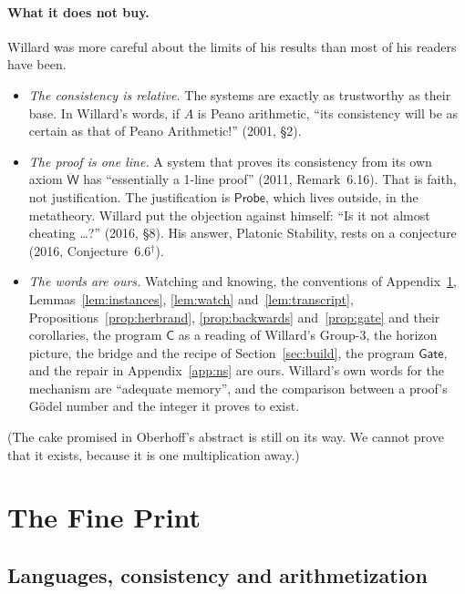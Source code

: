 \documentclass[11pt]{article}
\newcommand{\W}{\ddot{\mathsf{W}}}          %
\newcommand{\Prog}[1]{\mathsf{#1}}
\newcommand{\sk}{\ensuremath{^\dagger}}    %
\theoremstyle{plain}
\theoremstyle{definition}
\begin{document}
\paragraph{What it does not buy.} Willard was more careful about the limits
of his results than most of his readers have been.
\begin{itemize}[leftmargin=1.5em]
\item \emph{The consistency is relative.} The systems are exactly as
  trustworthy as their base. In Willard's words, if $A$ is Peano arithmetic,
  ``its consistency will be as certain as that of Peano Arithmetic!''
  (2001, \S2).
\item \emph{The proof is one line.} A system that proves its consistency from
  its own axiom $\W$ has ``essentially a 1-line proof'' (2011, Remark~6.16).
  That is faith, not justification. The justification is $\Prog{Probe}$,
  which lives outside, in the metatheory. Willard put the objection against
  himself: ``Is it not almost cheating \ldots?'' (2016, \S8). His answer,
  Platonic Stability, rests on a conjecture (2016, Conjecture~6.6\sk).
\item \emph{The words are ours.} Watching and knowing, the conventions of
  Appendix~\ref{app:fine}, Lemmas~\ref{lem:instances}, \ref{lem:watch}
  and~\ref{lem:transcript}, Propositions~\ref{prop:herbrand},
  \ref{prop:backwards} and~\ref{prop:gate} and their corollaries, the
  program $\Prog{C}$ as a reading of Willard's Group-3, the horizon picture,
  the bridge and the recipe of Section~\ref{sec:build}, the program
  $\Prog{Gate}$, and the repair in Appendix~\ref{app:ns} are ours. Willard's
  own words for the mechanism are ``adequate memory'', and the comparison
  between a proof's Gödel number and the integer it proves to exist.
\end{itemize}

\medskip\noindent
{\small (The cake promised in Oberhoff's abstract is still on its way. We
cannot prove that it exists, because it is one multiplication away.)}

\appendix

\section{The Fine Print}
\label{app:fine}

\subsection{Languages, consistency and arithmetization}
\end{document}
